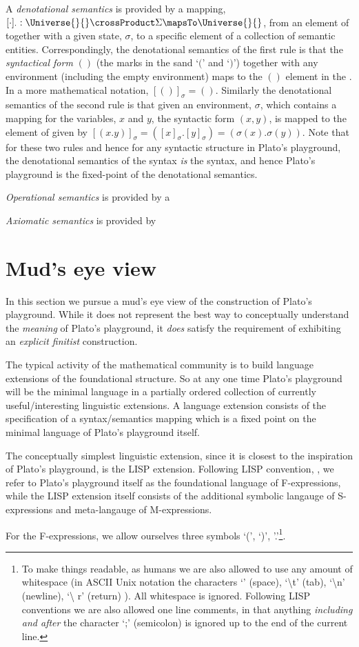 A \emph{denotational semantics} is provided by a mapping, $[ \cdot ]_{\cdot} :
\Universe{}{} \crossProduct \Sigma \mapsTo \Universe{}{}$, from an element of
\Universe{}{} together with a given state, $\sigma$, to a specific element of a
collection of semantic entities. Correspondingly, the denotational semantics of
the first rule is that the \emph{syntactical form} $()$ (the marks in the sand
`$($' and `$)$') together with any environment (including the empty environment)
maps to the $()$ element in the \Universe{}{}. In a more mathematical notation,
$[()]_{\sigma} = ()$. Similarly the denotational semantics of the second rule is
that given an environment, $\sigma$, which contains a mapping for the variables,
$x$ and $y$, the syntactic form $(x , y)$, is mapped to the element of
\Universe{}{} given by $[ ( x . y ) ]_{\sigma} = ( [x]_{\sigma} . [y]_{\sigma} )
= ( \sigma(x) . \sigma(y) )$. Note that for these two rules and hence for any
syntactic structure in Plato's playground, the denotational semantics of the
syntax \emph{is} the syntax, and hence Plato's playground is the fixed-point of
the denotational semantics.

\emph{Operational semantics} is provided by a 

\emph{Axiomatic semantics} is provided by

\section{Mud's eye view}

In this section we pursue a mud's eye view of the construction of Plato's
playground. While it does not represent the best way to conceptually understand
the \emph{meaning} of Plato's playground, it \emph{does} satisfy the requirement
of exhibiting an \emph{explicit finitist} construction.

The typical activity of the mathematical community is to build language
extensions of the foundational structure. So at any one time Plato's playground
will be the minimal language in a partially ordered collection of currently
useful/interesting linguistic extensions. A language extension consists of the
specification of a syntax/semantics mapping which is a fixed point on the
minimal language of Plato's playground itself.

The conceptually simplest linguistic extension, since it is closest to the
inspiration of Plato's playground, is the LISP extension. Following LISP
convention, \cite{mcCarthy1960lisp}, we refer to Plato's playground itself as
the foundational language of F-expressions, while the LISP extension itself
consists of the additional symbolic langauge of S-expressions and meta-langauge
of M-expressions.

For the F-expressions, we allow ourselves three symbols `(', `)',
'.'\footnote{To make things readable, as humans we are also allowed to use any
amount of whitespace (in ASCII Unix notation the characters `\textvisiblespace'
(space), `\textbackslash t' (tab), `\textbackslash n' (newline), `\textbackslash
r' (return) ). All whitespace is ignored. Following LISP conventions we are also
allowed one line comments, in that anything \emph{including and after} the
character `;' (semicolon) is ignored up to the end of the current line.}.


